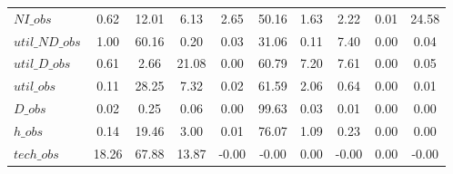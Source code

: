 \begin{center}
\begin{longtable}{lccccccccc}
$NI\_obs        $	 & 	         0.62	 & 	        12.01	 & 	         6.13	 & 	         2.65	 & 	        50.16	 & 	         1.63	 & 	         2.22	 & 	         0.01	 & 	        24.58 \\ 
$util\_ND\_obs  $	 & 	         1.00	 & 	        60.16	 & 	         0.20	 & 	         0.03	 & 	        31.06	 & 	         0.11	 & 	         7.40	 & 	         0.00	 & 	         0.04 \\ 
$util\_D\_obs   $	 & 	         0.61	 & 	         2.66	 & 	        21.08	 & 	         0.00	 & 	        60.79	 & 	         7.20	 & 	         7.61	 & 	         0.00	 & 	         0.05 \\ 
$util\_obs      $	 & 	         0.11	 & 	        28.25	 & 	         7.32	 & 	         0.02	 & 	        61.59	 & 	         2.06	 & 	         0.64	 & 	         0.00	 & 	         0.01 \\ 
$D\_obs         $	 & 	         0.02	 & 	         0.25	 & 	         0.06	 & 	         0.00	 & 	        99.63	 & 	         0.03	 & 	         0.01	 & 	         0.00	 & 	         0.00 \\ 
$h\_obs         $	 & 	         0.14	 & 	        19.46	 & 	         3.00	 & 	         0.01	 & 	        76.07	 & 	         1.09	 & 	         0.23	 & 	         0.00	 & 	         0.00 \\ 
$tech\_obs      $	 & 	        18.26	 & 	        67.88	 & 	        13.87	 & 	        -0.00	 & 	        -0.00	 & 	         0.00	 & 	        -0.00	 & 	         0.00	 & 	        -0.00 \\ 
\end{longtable}
 \end{center}
